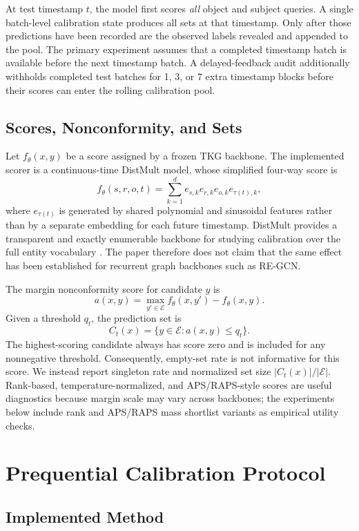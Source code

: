\documentclass[10pt,twocolumn]{article}
\begin{document}
At test timestamp \(t\), the model first scores \emph{all} object and subject
queries. A single batch-level calibration state produces all sets at that
timestamp. Only after those predictions have been recorded are the observed
labels revealed and appended to the pool. The primary experiment assumes that a
completed timestamp batch is available before the next timestamp batch. A
delayed-feedback audit additionally withholds completed test batches for
1, 3, or 7 extra timestamp blocks before their scores can enter the rolling
calibration pool.

\subsection{Scores, Nonconformity, and Sets}

Let \(f_\theta(x,y)\) be a score assigned by a frozen TKG backbone. The
implemented scorer is a continuous-time DistMult model, whose simplified
four-way score is
\[
  f_\theta(s,r,o,t)=\sum_{k=1}^{d}
  e_{s,k}e_{r,k}e_{o,k}e_{\tau(t),k},
\]
where \(e_{\tau(t)}\) is generated by shared polynomial and sinusoidal features
rather than by a separate embedding for each future timestamp. DistMult
provides a transparent and exactly enumerable backbone for studying calibration
over the full entity vocabulary \cite{yang2015distmult}. The paper therefore
does not claim that the same effect has been established for recurrent graph
backbones such as RE-GCN.

The margin nonconformity score for candidate \(y\) is
\[
  a(x,y)=\max_{y'\in\mathcal{E}}f_\theta(x,y')-f_\theta(x,y).
\]
Given a threshold \(q_t\), the prediction set is
\[
  C_t(x)=\{y\in\mathcal{E}:a(x,y)\leq q_t\}.
\]
The highest-scoring candidate always has score zero and is included for any
nonnegative threshold. Consequently, empty-set rate is not informative for this
score. We instead report singleton rate and normalized set size
\(|C_t(x)|/|\mathcal{E}|\). Rank-based, temperature-normalized, and
APS/RAPS-style scores are useful diagnostics because margin scale may vary
across backbones; the experiments below include rank and APS/RAPS mass
shortlist variants as empirical utility checks.

\section{Prequential Calibration Protocol}
\label{sec:method}

\subsection{Implemented Method}
\end{document}
